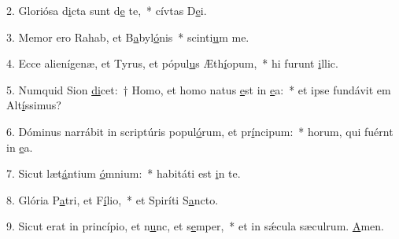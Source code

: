 2. Gloriósa d\uline{i}cta sunt d\uline{e} te,~* cívtas D\uline{e}i.\par 
3. Memor ero Rahab, et B\uline{a}byl\uline{ó}nis~* scinti\uline{u}m me.\par 
4. Ecce alienígenæ, et Tyrus, et pópul\uline{u}s Æth\uline{í}opum,~* hi furunt \uline{i}llic.\par 
5. Numquid Sion \uline{di}cet:~† Homo, et homo natus \uline{e}st in \uline{e}a:~* et ipse fundávit em Alt\uline{í}ssimus?\par 
6. Dóminus narrábit in scriptúris popul\uline{ó}rum, et pr\uline{í}ncipum:~* horum, qui fuérnt in \uline{e}a.\par 
7. Sicut læt\uline{á}ntium \uline{ó}mnium:~* habitáti est \uline{i}n te.\par 
8. Glória P\uline{a}tri, et F\uline{í}lio,~* et Spiríti S\uline{a}ncto.\par 
9. Sicut erat in princípio, et n\uline{u}nc, et s\uline{e}mper,~* et in sǽcula sæculrum. \uline{A}men.\par 
